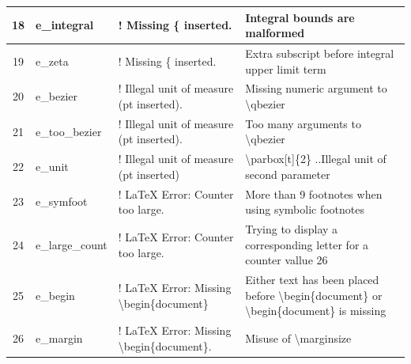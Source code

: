 \documentclass[12pt]{book}
\begin{document}
\begin{table}
\begin{tabular}{|c|l|l|l|}
		\hline
		18 & e\_integral                & ! Missing \{ inserted.                                        & Integral bounds are malformed                                                                                                \\ 
		\hline
		19 & e\_zeta                    & ! Missing \{ inserted.                                        & Extra subscript before integral upper limit term                                                                             \\ 
		\hline
		20 & e\_bezier                  & ! Illegal unit of measure (pt inserted).                      & Missing numeric argument to \textbackslash{}qbezier                                                                          \\ 
		\hline
		21 & e\_too\_bezier             & ! Illegal unit of measure (pt inserted).                      & Too many arguments to \textbackslash{}qbezier                                                                                \\ 
		\hline
		22 & e\_unit                    & ! Illegal unit of measure (pt inserted)                       & \textbackslash{}parbox[t]\{2\} ..Illegal unit of second parameter                                                            \\ 
		\hline
		23 & e\_symfoot                 & ! LaTeX Error: Counter too large.                             & More than 9 footnotes when using symbolic footnotes                                                                          \\ 
		\hline
		24 & e\_large\_count            & ! LaTeX Error: Counter too large.                             & Trying to display a corresponding letter for a counter vallue 26                                                             \\ 
		\hline
		25 & e\_begin                   & ! LaTeX Error: Missing \textbackslash{}begin\{document\}      & Either text has been placed before \textbackslash{}begin\{document\} or 
		\textbackslash{}begin\{document\} is missing  \\ 
		\hline
		26 & e\_margin                  & ! LaTeX Error: Missing \textbackslash{}begin\{document\}.     & Misuse of \textbackslash{}marginsize                                                                                         \\
		\hline
	\end{tabular}
\end{table}
\end{document}
